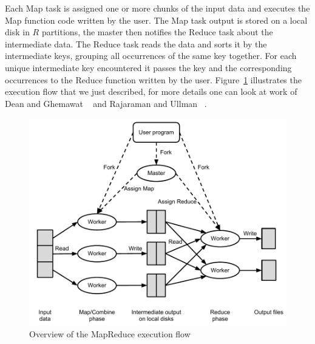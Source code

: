 Each Map task is assigned one or more chunks of the input data and executes the Map function code written by the user. The Map task output is stored on a local disk in $R$ partitions, the master then notifies the Reduce task about the intermediate data. The Reduce task reads the data and sorts it by the intermediate keys, grouping all occurrences of the same key together. For each unique intermediate key encountered it passes the key and the corresponding occurrences to the Reduce function written by the user. Figure~\ref{fig:mapreduce} illustrates the execution flow that we just described, for more details one can look at work of Dean and Ghemawat ~\citep{Dean:2004} and Rajaraman and Ullman ~\citep{Rajaraman:2011MMD}.
\begin{figure}[here]
\centerline{\includegraphics[width=1.0\textwidth]{Figures/MapReduceexecutionflow.pdf}}
\caption{Overview of the MapReduce execution flow}
\label{fig:mapreduce}
\end{figure}